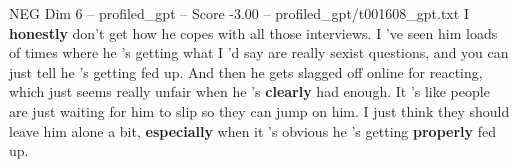 \begin{textsample}{NEG Dim 6 – profiled\_gpt – Score -3.00 – profiled\_gpt/t001608\_gpt.txt}  \label{ex:f6_neg_009}
I \textbf{honestly} don't get how he copes with all those interviews.
I ’ve seen him loads of times where he ’s getting what I ’d say are really sexist questions, and you can just tell he ’s getting fed up.
And then he gets slagged off online for reacting, which just seems really unfair when he ’s \textbf{clearly} had enough.
It ’s like people are just waiting for him to slip so they can jump on him.
I just think they should leave him alone a bit, \textbf{especially} when it ’s obvious he ’s getting \textbf{properly} fed up.

\end{textsample}
